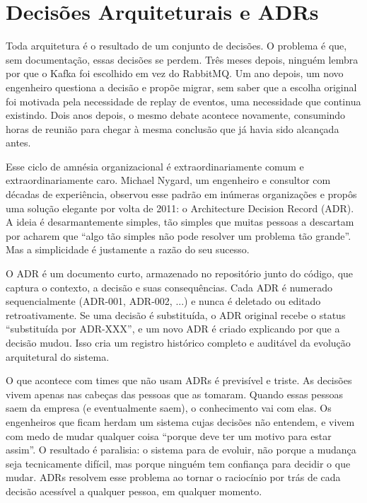 \section{Decisões Arquiteturais e ADRs}

Toda arquitetura é o resultado de um conjunto de decisões. O problema é que,
sem documentação, essas decisões se perdem. Três meses depois, ninguém lembra
por que o Kafka foi escolhido em vez do RabbitMQ. Um ano depois, um novo
engenheiro questiona a decisão e propõe migrar, sem saber que a escolha original
foi motivada pela necessidade de replay de eventos, uma necessidade que
continua existindo. Dois anos depois, o mesmo debate acontece novamente, consumindo
horas de reunião para chegar à mesma conclusão que já havia sido alcançada antes.

Esse ciclo de amnésia organizacional é extraordinariamente comum e
extraordinariamente caro. Michael Nygard, um engenheiro e consultor com décadas
de experiência, observou esse padrão em inúmeras organizações e propôs uma
solução elegante por volta de 2011: o Architecture Decision Record (ADR). A
ideia é desarmantemente simples, tão simples que muitas pessoas a descartam
por acharem que ``algo tão simples não pode resolver um problema tão grande''.
Mas a simplicidade é justamente a razão do seu sucesso.

O ADR é um documento curto, armazenado no repositório junto do código, que
captura o contexto, a decisão e suas consequências. Cada ADR é numerado
sequencialmente (ADR-001, ADR-002, ...) e nunca é deletado ou editado
retroativamente. Se uma decisão é substituída, o ADR original recebe o
status ``substituída por ADR-XXX'', e um novo ADR é criado explicando por
que a decisão mudou. Isso cria um registro histórico completo e auditável
da evolução arquitetural do sistema.

O que acontece com times que não usam ADRs é previsível e triste. As decisões
vivem apenas nas cabeças das pessoas que as tomaram. Quando essas pessoas saem
da empresa (e eventualmente saem), o conhecimento vai com elas. Os engenheiros
que ficam herdam um sistema cujas decisões não entendem, e vivem com medo de
mudar qualquer coisa ``porque deve ter um motivo para estar assim''. O resultado
é paralisia: o sistema para de evoluir, não porque a mudança seja tecnicamente
difícil, mas porque ninguém tem confiança para decidir o que mudar. ADRs
resolvem esse problema ao tornar o raciocínio por trás de cada decisão
acessível a qualquer pessoa, em qualquer momento.


